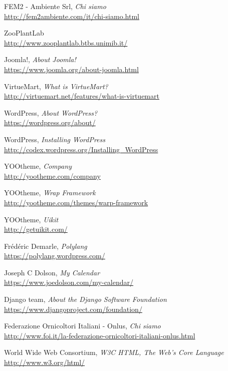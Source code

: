 \begin{thebibliography}{99}

	FEM2 - Ambiente Srl, \emph{Chi siamo} \\
	\url{http://fem2ambiente.com/it/chi-siamo.html}

	ZooPlantLab \\
	\url{http://www.zooplantlab.btbs.unimib.it/}

	Joomla!, \emph{About Joomla!} \\
	\url{https://www.joomla.org/about-joomla.html}

	VirtueMart, \emph{What is VirtueMart?} \\
	\url{http://virtuemart.net/features/what-is-virtuemart}
	
	WordPress, \emph{About WordPress?} \\
	\url{https://wordpress.org/about/}
	
	WordPress, \emph{Installing WordPress} \\
	\url{http://codex.wordpress.org/Installing_WordPress}	
	
	YOOtheme, \emph{Company} \\
	\url{http://yootheme.com/company}	

	YOOtheme, \emph{Wrap Framework} \\
	\url{http://yootheme.com/themes/warp-framework}	
	
	YOOtheme, \emph{Uikit} \\
	\url{http://getuikit.com/}	

	Frédéric Demarle, \emph{Polylang} \\
	\url{https://polylang.wordpress.com/}	

	Joseph C Dolson, \emph{My Calendar} \\
	\url{https://www.joedolson.com/my-calendar/}

	Django team, \emph{About the Django Software Foundation} \\
	\url{https://www.djangoproject.com/foundation/}

	Federazione Ornicoltori Italiani - Onlus, \emph{Chi siamo} \\
	\url{http://www.foi.it/la-federazione-ornicoltori-italiani-onlus.html}

	World Wide Web Consortium, \emph{W3C HTML, The Web’s Core Language} \\
	\url{http://www.w3.org/html/}
	

\end{thebibliography}
